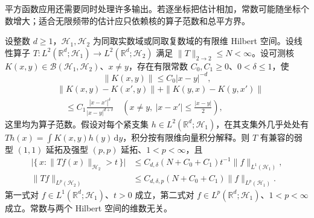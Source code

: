 平方函数应用还需要同时处理许多输出。若逐坐标把估计相加，常数可能随坐标个数增大；适合无限频带的估计应只依赖核的算子范数和总平方界。
\begin{proposition}\label{b2:prop:18-hilbert-valued-cz}
设整数 \(d\geq1\)，\(\mathcal H_1,\mathcal H_2\) 为同取实数域或同取复数域的有限维 Hilbert 空间。设线性算子
\(T:L^2(\mathbb R^d;\mathcal H_1)\to L^2(\mathbb R^d;\mathcal H_2)\)
满足 \(\|T\|_{2\to2}\leq N<\infty\)。设可测核
\(K(x,y)\in\mathcal B(\mathcal H_1,\mathcal H_2)\)、\(x\ne y\)，存在有限常数 \(C_0,C_1\geq0\)、\(0<\delta\leq1\)，使
\[
 \|K(x,y)\|\leq C_0|x-y|^{-d},
\]
\[
 \begin{aligned}
 &\|K(x,y)-K(x',y)\|+\|K(y,x)-K(y,x')\|\\
 &\quad\leq C_1\frac{|x-x'|^\delta}{|x-y|^{d+\delta}}
 \quad\left(x\ne y,\ |x-x'|\leq\frac{|x-y|}2\right),
 \end{aligned}
\]
这里均为算子范数。假设对每个紧支集 \(h\in L^2(\mathbb R^d;\mathcal H_1)\)，在其支集外几乎处处有
\(Th(x)=\int K(x,y)h(y)\,\mathrm dy\)，积分按有限维向量积分解释。则 \(T\) 有兼容的弱型 \((1,1)\) 延拓及强型 \((p,p)\) 延拓、\(1<p<\infty\)，且
\[
 \begin{aligned}
 \bigl|\{\,x:\|Tf(x)\|_{\mathcal H_2}>t\,\}\bigr|
 &\leq C_{d,\delta}(N+C_0+C_1)t^{-1}
                   \|f\|_{L^1(\mathcal H_1)},\\
 \|Tf\|_{L^p(\mathcal H_2)}
 &\leq C_{d,\delta,p}(N+C_0+C_1)\|f\|_{L^p(\mathcal H_1)}.
 \end{aligned}
\]
第一式对 \(f\in L^1(\mathbb R^d;\mathcal H_1)\)、\(t>0\) 成立，第二式对 \(f\in L^p(\mathbb R^d;\mathcal H_1)\)、\(1<p<\infty\) 成立。常数与两个 Hilbert 空间的维数无关。
\end{proposition}
